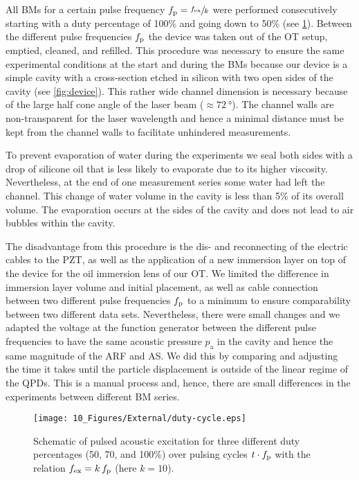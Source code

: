 All BMs for a certain pulse frequency $f_{\mathrm{p}}=\sfrac{f_{\mathrm{ex}}}{k}$ were performed 
consecutively starting with a duty percentage of 100\% and going down to 50\% 
(see \cref{fig:duty_cycle}). Between the different pulse frequencies $f_{\mathrm{p}}$ the 
device was taken out of the OT setup, emptied, cleaned, and refilled. This 
procedure was necessary to ensure the same experimental conditions at the start 
and during the BMs because our device is a simple cavity with a 
 cross-section etched 
in silicon with two open sides of the cavity (see \cref{fig:device}). This 
rather wide channel dimension is necessary because of the large half cone angle 
of the laser beam ($\approx \SI{72}{\degree}$). The channel walls are 
non-transparent for the laser wavelength and hence a minimal distance must be 
kept from the channel walls to facilitate unhindered measurements.

To prevent evaporation of water during the experiments we seal both sides with 
a drop of silicone oil that is less likely to evaporate due to its higher 
viscosity. Nevertheless, at the end of one measurement series some water had 
left the channel. This change of water volume in the cavity is less than 5\% of 
its overall volume. The evaporation occurs at the sides of the cavity and does 
not lead to air bubbles within the cavity.

The disadvantage from this procedure is the dis- and reconnecting of the 
electric cables to the PZT, as well as the application of a new immersion layer 
on top of the device for the oil immersion lens of our OT. We limited the 
difference in immersion layer volume and initial placement, as well as cable 
connection between two different pulse frequencies $f_{\mathrm{p}}$ to a minimum to ensure 
comparability between two different data sets. Nevertheless, there were small 
changes and we adapted the voltage at the function generator between the 
different pulse frequencies to have the same acoustic pressure $p_{\mathrm{a}}$ 
in the cavity and hence the same magnitude of the ARF and AS. We did this by 
comparing and adjusting the time it takes until the particle displacement is 
outside of the linear regime of the QPDs. This is a manual process and, hence, 
there are small differences in the experiments between different BM series.


\begin{figure}[tbp]
  \centering
  \texttt{[image: 10\_Figures/External/duty-cycle.eps]}
  \caption{Schematic of pulsed acoustic excitation for three different duty 
      percentages (50, 70, and 100\%) over pulsing cycles $t\cdot f_{\mathrm{p}}$ with the 
      relation $f_{\mathrm{ex}}=k\,f_{\mathrm{p}}$ (here $k=10$).
  }\label{fig:duty_cycle}
\end{figure}

